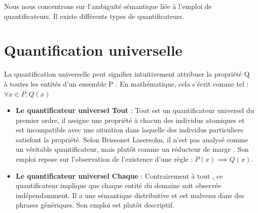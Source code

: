 \documentclass[11pt,letterpaper]{article}
\begin{document}
Nous nous concentrons sur l'ambiguïté sémantique liée à l'emploi de quantificateurs. Il existe différents types de quantificateurs.
\vspace{0.3cm}
\section{Quantification universelle}
La  quantification  universelle  peut  signifier  intuitivement  \og attribuer  la  propriété  Q  à  toutes  les entités d’un ensemble P\fg{} \cite{conditions}.
En mathématique, cela s'écrit comme tel : \og $\forall x \in P,  Q(x)$ \fg{}
        \begin{itemize}
            \item \textbf{Le quantificateur universel \og Tout \fg{}} : \og Tout \fg{} est un  quantificateur  universel  du  premier  ordre,  il  assigne  une  propriété  à  chacun  des individus atomiques et est incompatible avec une situation dans laquelle des individus particuliers satisfont la propriété. Selon Brissonet Lasersohn, il n’est pas analysé comme un véritable quantificateur, mais plutôt comme un \og réducteur de marge \fg{}. Son emploi repose sur l’observation de l’existence d’une règle : $P(x) \implies Q(x)$. \cite{trio}
    
            \item \textbf{Le quantificateur universel \og Chaque \fg{}} : Contrairement à \og tout \fg{}, ce quantificateur implique que chaque entité du domaine soit observée indépendamment. Il a une sémantique distributive et est malvenu dans des phrases génériques. Son emploi est plutôt descriptif. \cite{plural} \cite{predicate}
        \end{itemize}

\vspace{0.2cm}
 
\end{document}
